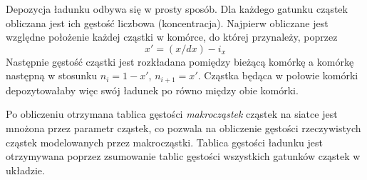  Depozycja ładunku odbywa się w prosty sposób. Dla każdego gatunku
cząstek obliczana jest ich gęstość liczbowa (koncentracja). Najpierw
obliczane jest względne położenie każdej cząstki w komórce, do której
przynależy, poprzez
\begin{equation}
x' = (x/dx) - i_x
\label{eqn:relative-position}
\end{equation}
Następnie gęstość cząstki jest rozkładana pomiędzy bieżącą komórkę a
komórkę następną w stosunku $n_i = 1-x'$, $n_{i+1} = x'$. Cząstka będąca
w połowie komórki depozytowałaby więc swój ładunek po równo między obie
komórki.



Po obliczeniu otrzymana tablica gęstości \emph{makrocząstek} cząstek na
siatce jest mnożona przez parametr  cząstek, co pozwala na
obliczenie gęstości rzeczywistych cząstek modelowanych przez makrocząstki.
Tablica gęstości ładunku jest otrzymywana poprzez zsumowanie tablic gęstości
wszystkich gatunków cząstek w układzie.


%
%
%

